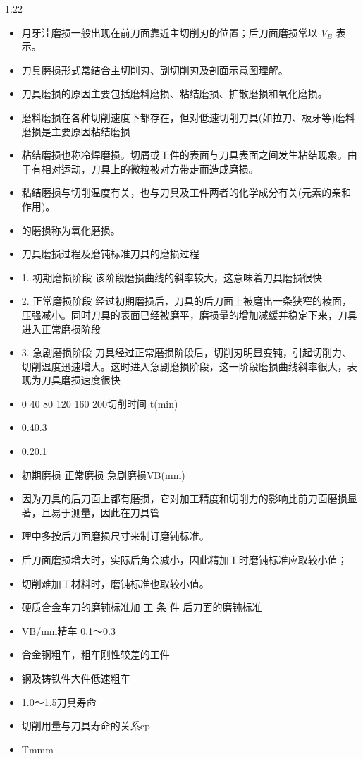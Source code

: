 \documentclass[12pt,a4paper]{article}
\begin{document}
\begin{spacing}{1.22}
\begin{itemize}[leftmargin=2.2em,label=--]
  \item 月牙洼磨损一般出现在前刀面靠近主切削刃的位置；后刀面磨损常以 $V_B$ 表示。
  \item 刀具磨损形式常结合主切削刃、副切削刃及剖面示意图理解。
  \item 刀具磨损的原因主要包括磨料磨损、粘结磨损、扩散磨损和氧化磨损。
  \item 磨料磨损在各种切削速度下都存在，但对低速切削刀具(如拉刀、板牙等)磨料磨损是主要原因粘结磨损
  \item 粘结磨损也称冷焊磨损。切屑或工件的表面与刀具表面之间发生粘结现象。由于有相对运动，刀具上的微粒被对方带走而造成磨损。
  \item 粘结磨损与切削温度有关，也与刀具及工件两者的化学成分有关(元素的亲和作用)。
  \item 的磨损称为氧化磨损。
  \item 刀具磨损过程及磨钝标准刀具的磨损过程
  \item 1. 初期磨损阶段 该阶段磨损曲线的斜率较大，这意味着刀具磨损很快
  \item 2. 正常磨损阶段 经过初期磨损后，刀具的后刀面上被磨出一条狭窄的棱面，压强减小。同时刀具的表面已经被磨平，磨损量的增加减缓并稳定下来，刀具进入正常磨损阶段
  \item 3. 急剧磨损阶段 刀具经过正常磨损阶段后，切削刃明显变钝，引起切削力、切削温度迅速增大。这时进入急剧磨损阶段，这一阶段磨损曲线斜率很大，表现为刀具磨损速度很快
  \item 0 40 80 120 160 200切削时间 t(min)
  \item 0.40.3
  \item 0.20.1
  \item 初期磨损 正常磨损 急剧磨损VB(mm)
  \item 因为刀具的后刀面上都有磨损，它对加工精度和切削力的影响比前刀面磨损显著，且易于测量，因此在刀具管
  \item 理中多按后刀面磨损尺寸来制订磨钝标准。
  \item 后刀面磨损增大时，实际后角会减小，因此精加工时磨钝标准应取较小值；
  \item 切削难加工材料时，磨钝标准也取较小值。
  \item 硬质合金车刀的磨钝标准加 工 条 件 后刀面的磨钝标准
  \item VB/mm精车 0.1～0.3
  \item 合金钢粗车，粗车刚性较差的工件
  \item 钢及铸铁件大件低速粗车
  \item 1.0～1.5刀具寿命
  \item 切削用量与刀具寿命的关系cp
  \item Tmmm

\end{itemize}
\end{spacing}
\end{document}
